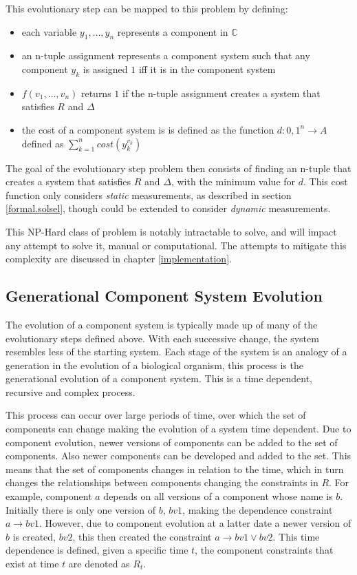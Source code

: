 This evolutionary step can be mapped to this problem by defining:
\begin{itemize}
  \item each variable $y_1,\ldots,y_n$ represents a component in $\mathbb{C}$
  \item an n-tuple assignment represents a component system such that any component $y_k$ is assigned $1$ iff it is in the component system 
  \item $f(v_1,\ldots,v_n)$ returns $1$ if the n-tuple assignment creates a system that satisfies $R$ and $\Delta$
  \item the cost of a component system is is defined as the function $d : {0,1}^n \rightarrow A$ defined as $\sum^n_{k=1}cost(y^{v_k}_{k})$
\end{itemize}
The goal of the evolutionary step problem then consists of finding an n-tuple that creates a system that satisfies $R$ and $\Delta$,
with the minimum value for $d$.
This cost function only considers \textit{static} measurements, as described in section \ref{formal.solsel}, though could be extended to consider \textit{dynamic} measurements.

This NP-Hard class of problem is notably intractable to solve, and will impact any attempt to solve it, manual or computational.
The attempts to mitigate this complexity are discussed in chapter \ref{implementation}.

\subsection{Generational Component System Evolution}
\label{formal.evo}
The evolution of a component system is typically made up of many of the evolutionary steps defined above. 
With each successive change, the system resembles less of the starting system.
Each stage of the system is an analogy of a generation in the evolution of a biological organism, this process is the generational evolution of a component system.
This is a time dependent, recursive and complex process. 

This process can occur over large periods of time, over which the set of components can change making the evolution of a system time dependent.
Due to component evolution, newer versions of components can be added to the set of components.
Also newer components can be developed and added to the set.
This means that the set of components changes in relation to the time, which in turn changes the relationships between components changing the constraints in $R$.
For example, component $a$ depends on all versions of a component whose name is $b$.
Initially there is only one version of $b$, $bv1$, making the dependence constraint $a \rightarrow bv1$.
However, due to component evolution at a latter date a newer version of $b$ is created, $bv2$, this then created the constraint $a \rightarrow bv1 \vee bv2$.
This time dependence is defined, given a specific time $t$, the component constraints that exist at time $t$ are denoted as $R_t$.

